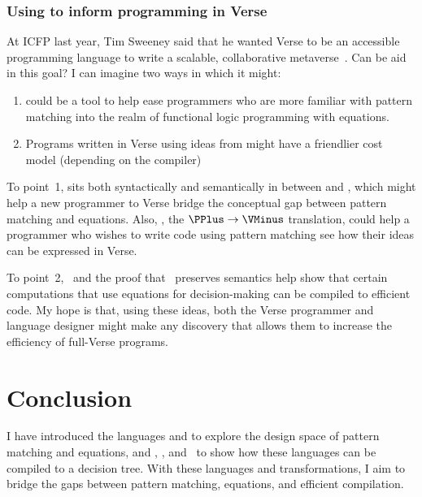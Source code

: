 \documentclass[manuscript,screen,review, 12pt, nonacm]{acmart}
\begin{document}
        \subsubsection{Using \VMinus to inform programming in Verse}
        \label{vminusandvc}
        
        At ICFP last year, Tim Sweeney said that he wanted Verse to be an
        accessible programming language to write a scalable, collaborative
        metaverse~\citep{timtalk}. Can \VMinus be aid in this goal? I can imagine
        two ways in which it might:
        
        \begin{enumerate}
            \item \VMinus could be  a tool to help ease programmers who are
            more familiar with pattern matching into the realm of functional
            logic programming with equations. 
            \item Programs written in Verse using ideas from \VMinus might have
            a friendlier cost model (depending on the compiler)
        \end{enumerate}
        
        To point~1, \VMinus sits both syntactically and semantically in between
        \PPlus and \VC, which might help a new programmer to Verse bridge the
        conceptual gap between pattern matching and equations. Also, \PtoVTran,
        the $\PPlus \rightarrow \VMinus$ translation, could help a programmer 
        who wishes to write code using pattern matching see how their ideas 
        can be expressed in Verse. 

        To point~2, \DTran\ and the proof that \DTran\ preserves semantics help
        show that certain computations that use equations for decision-making
        can be compiled to efficient code. My hope is that, using these ideas,
        both the Verse programmer and language designer might make any discovery
        that allows them to increase the efficiency of full-Verse programs. 

    \section{Conclusion}

    I have introduced the languages \PPlus and \VMinus to explore the design
    space of pattern matching and equations, and \D, \PtoVTran, and \DTran\ to
    show how these languages can be compiled to a decision tree. With these
    languages and transformations, I aim to bridge the gaps between pattern
    matching, equations, and efficient compilation. 
\end{document}
